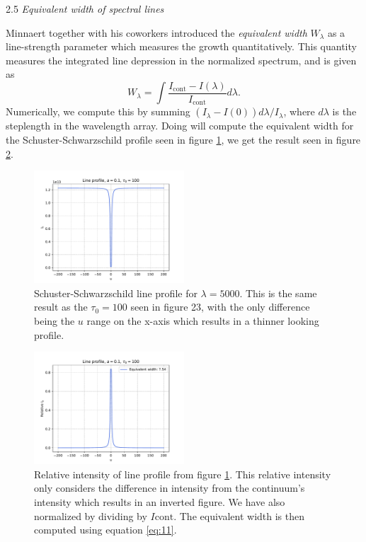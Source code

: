 \documentclass[a4paper,11.5pt,]{article}
\begin{document}
\begin{multicols}{2}
\begin{center}
2.5\textit{ Equivalent width of spectral lines}
\end{center}
Minnaert together with his coworkers introduced the \textit{equivalent width} $W_\lambda$ as a line-strength parameter which measures the growth quantitatively. This quantity measures the integrated line depression in the normalized spectrum, and is given as
\begin{equation}\label{eq:11}
    W_\lambda = \int \frac{I_\text{cont} - I(\lambda)}{I_\text{cont}} d\lambda.
\end{equation}
Numerically, we compute this by summing $(I_\lambda - I(0))d\lambda/I_\lambda$, where $d\lambda$ is the steplength in the wavelength array. Doing will compute the equivalent width for the Schuster-Schwarzschild profile seen in figure \ref{fig:25}, we get the result seen in figure \ref{fig:26}.

\begin{figure}[H]
	\centering
	\includegraphics[width=0.5\textwidth]{SSA/figures/lprof.pdf}
	\caption{Schuster-Schwarzschild line profile for $\lambda = 5000$. This is the same result as the $\tau_0 = 100$ seen in figure 23, with the only difference being the $u$ range on the x-axis which results in a thinner looking profile.}
	\label{fig:25}
\end{figure}

\begin{figure}[H]
	\centering
	\includegraphics[width=0.5\textwidth]{SSA/figures/eqwidth.pdf}
	\caption{Relative intensity of line profile from figure \ref{fig:25}. This relative intensity only considers the difference in intensity from the continuum's intensity which results in an inverted figure. We have also normalized by dividing by $I\text{cont}$. The equivalent width is then computed using equation \eqref{eq:11}.}
	\label{fig:26}
\end{figure}


\end{multicols}
\end{document}
